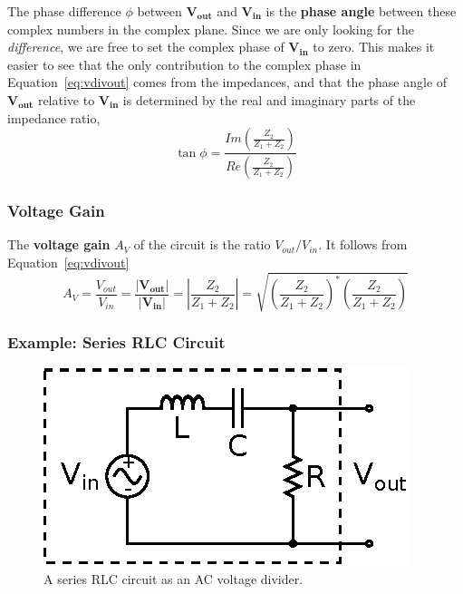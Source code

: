\documentclass[11pt]{article}
\begin{document}
The phase difference $\phi$ between $\mathbf{V_{out}}$ and
$\mathbf{V_{in}}$ is the \textbf{phase angle} between these complex
numbers in the complex plane. Since we are only looking for the 
\emph{difference}, we are free to set the complex phase of $\mathbf{V_{in}}$
to zero. This makes it easier to see that the only contribution to the
complex phase in Equation~\ref{eq:vdivout} comes from the impedances,
and that the phase angle of $\mathbf{V_{out}}$ relative to
$\mathbf{V_{in}}$ is determined by the real and imaginary parts of the
impedance ratio,
\begin{equation}
  \tan \phi = \frac{ Im \left( \frac{Z_2}{Z_1 + Z_2} \right) }
                   { Re \left( \frac{Z_2}{Z_1 + Z_2} \right) }
  \label{eq:vdivphase}
\end{equation}

\subsubsection*{Voltage Gain}

The \textbf{voltage gain} $A_V$ of the circuit is the ratio
$V_{out}/V_{in}$. It follows from Equation~\ref{eq:vdivout}
\begin{equation}
  A_V = \frac{V_{out}}{V_{in}} = \frac{|\mathbf{V_{out}}|}{|\mathbf{V_{in}}|}
                             = \left| \frac{Z_2}{Z_1 + Z_2} \right|
                             = \sqrt{ \left( \frac{Z_2}{Z_1 + Z_2} \right)^*
                                      \left( \frac{Z_2}{Z_1 + Z_2} \right) }
  \label{eq:gain}
\end{equation}

\subsubsection*{Example: Series RLC Circuit}

\begin{figure}[ht]
  \begin{center}
    \includegraphics{rlccircuit.eps}
    \caption{A series RLC circuit as an AC voltage divider.}
    \label{fig:rlccircuit}
  \end{center}
\end{figure}
\end{document}
